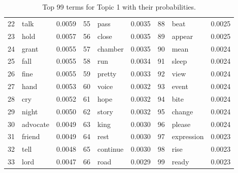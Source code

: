 \begin{table}[ht]
\begin{tabular}{rlrrlrrlr}
  22 & talk & 0.0059 & 55 & pass & 0.0035 & 88 & beat & 0.0025 \\ 
  23 & hold & 0.0057 & 56 & close & 0.0035 & 89 & appear & 0.0025 \\ 
  24 & grant & 0.0055 & 57 & chamber & 0.0035 & 90 & mean & 0.0024 \\ 
  25 & fall & 0.0055 & 58 & run & 0.0034 & 91 & sleep & 0.0024 \\ 
  26 & fine & 0.0055 & 59 & pretty & 0.0033 & 92 & view & 0.0024 \\ 
  27 & hand & 0.0053 & 60 & voice & 0.0032 & 93 & event & 0.0024 \\ 
  28 & cry & 0.0052 & 61 & hope & 0.0032 & 94 & bite & 0.0024 \\ 
  29 & night & 0.0050 & 62 & story & 0.0032 & 95 & change & 0.0024 \\ 
  30 & advocate & 0.0049 & 63 & king & 0.0030 & 96 & please & 0.0024 \\ 
  31 & friend & 0.0049 & 64 & rest & 0.0030 & 97 & expression & 0.0023 \\ 
  32 & tell & 0.0048 & 65 & continue & 0.0030 & 98 & rise & 0.0023 \\ 
  33 & lord & 0.0047 & 66 & road & 0.0029 & 99 & ready & 0.0023 \\ 
   \hline
\end{tabular}
\caption{\small{ Top 99 terms for Topic 1 with their probabilities.}} 
\label{topic_1_terms}
\end{table}
